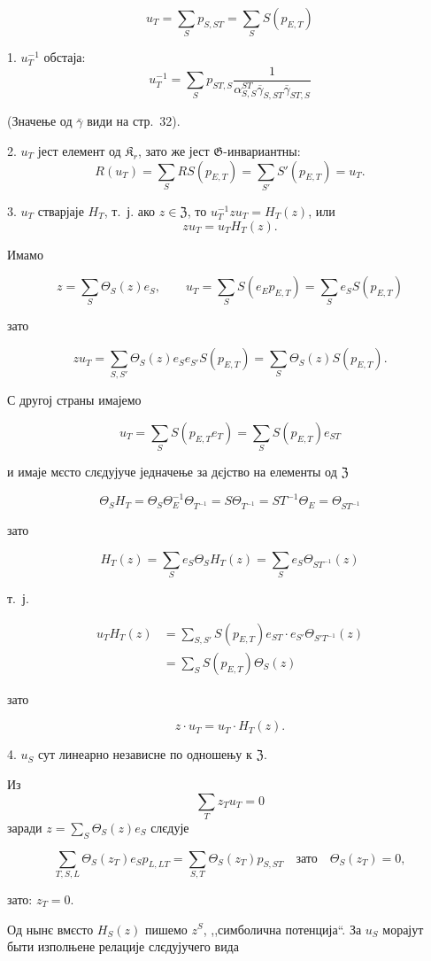 \documentclass[11pt]{article}
\begin{document}
\[
u_T=\sum_S p_{S,ST}=\sum_S S(p_{E,T})
\]



1. \(u_T^{-1}\) обстаја:
\[
u_T^{-1}=\sum_S p_{ST,S}
\frac{1}{\alpha_{S,S}^{ST}\overline{\gamma}_{S,ST}\overline{\gamma}_{ST,S}}
\]

(Значење од \(\bar{\gamma}\) види на стр.~32).

2. \(u_T\) јест елемент од \(\mathfrak K_r\), зато же јест \(\mathfrak G\)-инвариантны:
\[
R(u_T)=\sum_S RS(p_{E,T})=\sum_{S'} S'(p_{E,T})=u_T.
\]

3. \(u_T\) стварјаје \(H_T\), т.~ј. ако \(z\in\mathfrak Z\), то \(u_T^{-1}zu_T=H_T(z)\), или
\[
z u_T=u_T H_T(z).
\]

Имамо

\[
z=\sum_S\Theta_S(z)e_S,\qquad
u_T=\sum_S S(e_Ep_{E,T})=\sum_S e_S S(p_{E,T})
\]

зато

\[
zu_T=\sum_{S,S'}\Theta_S(z)e_Se_{S'}S(p_{E,T})
=\sum_S\Theta_S(z)S(p_{E,T}).
\]

С другој страны имајемо

\[
u_T=\sum_S S(p_{E,T}e_T)=\sum_S S(p_{E,T})e_{ST}
\]

и имаје мєсто слєдујуче једначење за дєјство на елементы од \(\mathfrak Z\)

\[
\Theta_S H_T=\Theta_S\Theta_E^{-1}\Theta_{T^{-1}}
=S\Theta_{T^{-1}}=ST^{-1}\Theta_E=\Theta_{ST^{-1}}
\]

зато

\[
H_T(z)=\sum_S e_S\Theta_S H_T(z)=\sum_S e_S\Theta_{ST^{-1}}(z)
\]

т.~ј.

\[
\begin{aligned}
u_TH_T(z)
&=\sum_{S,S'} S(p_{E,T})e_{ST}\cdot e_{S'}\Theta_{S'T^{-1}}(z)\\
&=\sum_S S(p_{E,T})\Theta_S(z)
\end{aligned}
\]

зато

\[
z\cdot u_T=u_T\cdot H_T(z).
\]

4. \(u_S\) сут линеарно независне по одношењу к \(\mathfrak Z\).

Из
\[
\sum_T z_Tu_T=0
\]
заради \(z=\sum_S\Theta_S(z)e_S\) слєдује

\[
\sum_{T,S,L}\Theta_S(z_T)e_Sp_{L,LT}
=\sum_{S,T}\Theta_S(z_T)p_{S,ST}\quad\text{зато}\quad
\Theta_S(z_T)=0,
\]

зато: \(z_T=0\).

Од нынє вмєсто \(H_S(z)\) пишемо \(z^S\), ,,симболична потенција``. За \(u_S\) морајут быти изполњене релације слєдујучего вида
\end{document}
